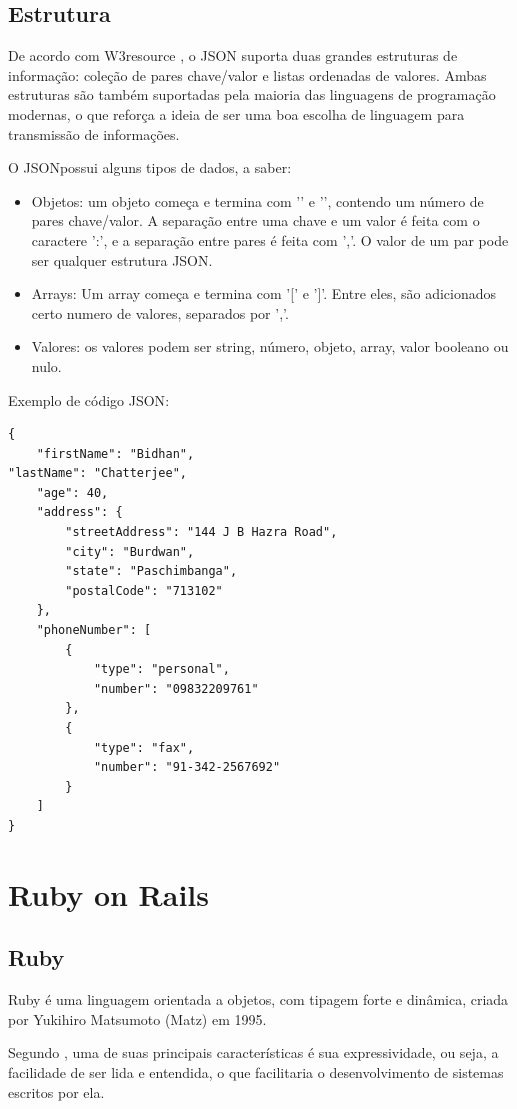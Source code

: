 \subsection{Estrutura}
	De acordo com W3resource \cite{w3json}, o \ac{JSON} suporta duas grandes estruturas de informação: coleção de pares chave/valor e listas ordenadas de valores. Ambas estruturas são também suportadas pela maioria das linguagens de programação modernas, o que reforça a ideia de ser uma boa escolha de linguagem para transmissão de informações.
	
	O \ac{JSON}possui alguns tipos de dados, a saber:
\begin{itemize}
\item Objetos: um objeto começa e termina com '{' e '}', contendo um número de pares chave/valor.  A separação entre uma chave e um valor é feita com o caractere ':',  e a separação entre pares é feita com ','. O valor de um par pode ser qualquer estrutura \ac{JSON}.
\item Arrays: Um array começa e termina com '[' e ']'. Entre eles, são adicionados certo numero de valores, separados por ','. 
\item Valores: os valores podem ser string, número, objeto, array, valor booleano ou nulo.
\end{itemize}
Exemplo de código \ac{JSON}:

\begin{lstlisting}
{
    "firstName": "Bidhan",
"lastName": "Chatterjee",
    "age": 40,
    "address": {
        "streetAddress": "144 J B Hazra Road",
        "city": "Burdwan",
        "state": "Paschimbanga",
        "postalCode": "713102"
    },
    "phoneNumber": [
        {
            "type": "personal",
            "number": "09832209761"
        },
        {
            "type": "fax",
            "number": "91-342-2567692"
        }
    ]
}
\end{lstlisting}

\section{Ruby on Rails}

\subsection{Ruby}
	Ruby é uma linguagem orientada a objetos, com tipagem forte e dinâmica, criada por Yukihiro Matsumoto (Matz) em 1995. 
	
	Segundo \cite{caelum}, uma de suas principais características é sua expressividade, ou seja, a facilidade de ser lida e entendida, o que facilitaria o desenvolvimento de sistemas escritos por ela.
	
